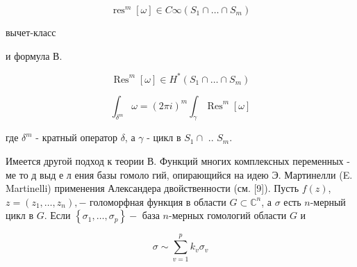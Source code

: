 \documentclass[10pt]{article}
\begin{document}
\[

\operatorname{res}^{m}[\omega] \in C \infty\left(S_{1} \cap \ldots \cap S_{m}\right)

\]



вычет-класс



и формула В.



\[

\operatorname{Res}^{m}[\omega] \in H^{*}\left(S_{1} \cap \ldots \cap S_{m}\right)

\]



\[

\int_{\delta^{m}} \omega=(2 \pi i)^{m} \int_{\gamma} \operatorname{Res}^{m}[\omega]

\]



где $\delta^{m}$ - кратный оператор $\delta$, а $\gamma$ - цикл в $S_{1} \cap$ .. $S_{m}$.



Имеется другой подход к теории В. Функций многих комплексных переменных - ме то д выд е л ения базы гомоло гий, опирающийся на идею Э. Мартинелли (E. Martinelli) применения Александера двойственности (см. [9]). Пусть $f(z)$, $z=\left(z_{1}, \ldots, z_{n}\right),-$ голоморфная функция в области $G \subset \mathbb{C}^{n}$, а $\sigma$ есть $n$-мерный цикл в $G$. Если $\left\{\sigma_{1}, \ldots, \sigma_{p}\right\}-$ база $n$-мерных гомологий области $G$ и



\[

\sigma \sim \sum_{v=1}^{p} k_{v} \sigma_{v}

\]
\end{document}
